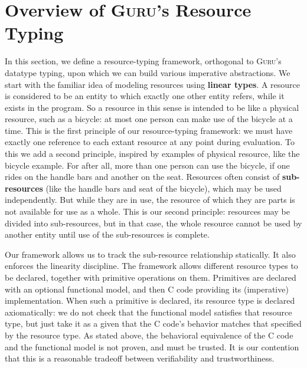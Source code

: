 \documentclass[9pt,natbib]{sigplanconf}
\begin{document}
\section{Overview of \textsc{Guru}'s Resource Typing}

In this section, we define a resource-typing framework, orthogonal to
\textsc{Guru}'s datatype typing, upon which we can build various
imperative abstractions.  We start with the familiar idea of modeling
resources using \textbf{linear types}.  A resource is considered to be
an entity to which exactly one other entity refers, while it exists in
the program.  So a resource in this sense is intended to be like a
physical resource, such as a bicycle: at most one person can make use
of the bicycle at a time.  This is the first principle of our
resource-typing framework: we must have exactly one reference to each
extant resource at any point during evaluation.  To this we add a
second principle, inspired by examples of physical resource, like the
bicycle example.  For after all, more than one person can use the
bicycle, if one rides on the handle bars and another on the seat.
Resources often consist of \textbf{sub-resources} (like the handle
bars and seat of the bicycle), which may be used independently.  But
while they are in use, the resource of which they are parts is not
available for use as a whole.  This is our second principle: resources
may be divided into sub-resources, but in that case, the whole
resource cannot be used by another entity until use of the
sub-resources is complete.  

Our framework allows us to track the sub-resource relationship
statically.  It also enforces the linearity discipline.  The framework
allows different resource types to be declared, together with
primitive operations on them.  Primitives are declared with an
optional functional model, and then C code providing its (imperative)
implementation.  When such a primitive is declared, its resource type
is declared axiomatically: we do not check that the functional model
satisfies that resource type, but just take it as a given that the C
code's behavior matches that specified by the resource type.  As
stated above, the behavioral equivalence of the C code and the
functional model is not proven, and must be trusted.  It is our
contention that this is a reasonable tradeoff between verifiability
and trustworthiness.
\end{document}
